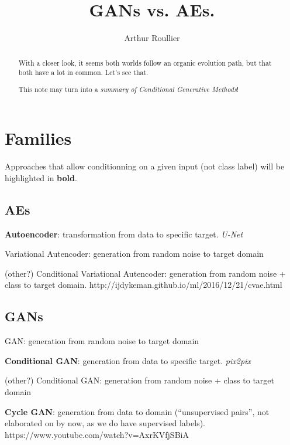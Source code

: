 \documentclass{article}
\title{GANs vs. AEs.}
\author{Arthur Roullier}
\begin{document}
\maketitle


\begin{abstract}
	With a closer look, it seems both worlds follow an organic evolution path, but that both have a lot in common. Let's see that.

This note may turn into a \emph{summary of Conditional Generative Methods}!

\end{abstract}



\section{Families}

Approaches that allow conditionning on a given input (not class label) will be highlighted in \textbf{bold}.



\subsection{AEs}


\textbf{Autoencoder}: transformation from data to specific target. \emph{U-Net} \cite{ronneberger_u-net:_2015}

Variational Autencoder: generation from random noise to target domain

(other?) Conditional Variational Autencoder: generation from random noise + class to target domain. http://ijdykeman.github.io/ml/2016/12/21/cvae.html



\subsection{GANs}


GAN: generation from random noise to target domain

\textbf{Conditional GAN}: generation from data to specific target. \emph{pix2pix} \cite{isola_image--image_2016}

(other?) Conditional GAN: generation from random noise + class to target domain

\textbf{Cycle GAN}: generation from data to domain (``unsupervised pairs'', not elaborated on by now, as we do have supervised labels). https://www.youtube.com/watch?v=AxrKVfjSBiA
\end{document}
